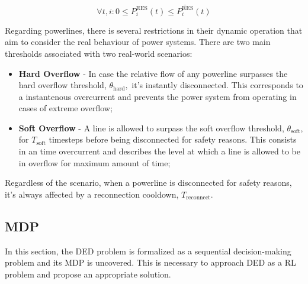\begin{equation} \label{eq:res-limits}
	\forall t, i: 0 \leq P^\text{RES}_i (t) \leq \overline{P^\text{RES}_i} (t)
\end{equation}

Regarding powerlines, there is several restrictions in their dynamic operation that aim to consider the real behaviour of power systems. There are two main thresholds associated with two real-world scenarios:

\begin{itemize}
	\item \textbf{Hard Overflow} - In case the relative flow of any powerline surpasses the hard overflow threshold, $\theta_\text{hard},$ it's instantly disconnected. This corresponds to a instantenous overcurrent and prevents the power system from operating in cases of extreme overflow;
	\item \textbf{Soft Overflow} - A line is allowed to surpass the soft overflow threshold, $\theta_\text{soft}$, for $T_\text{soft}$ timesteps before being disconnected for safety reasons. This consists in an time overcurrent and describes the level at which a line is allowed to be in overflow for maximum amount of time;
\end{itemize}
Regardless of the scenario, when a powerline is disconnected for safety reasons, it's always affected by a reconnection cooldown, $T_\text{reconnect}$.

\subsection{\acf{MDP}} \label{sec:method-mdp}

In this section, the \ac{DED} problem is formalized as a sequential decision-making problem and its \ac{MDP} is uncovered. This is necessary to approach \ac{DED} as a \ac{RL} problem and propose an appropriate solution. 

